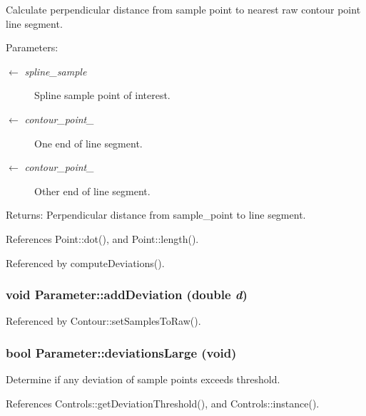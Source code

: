 Calculate perpendicular distance from sample point to nearest raw contour point line segment. \begin{Desc}
\item[Parameters:]
\begin{description}
\item[\mbox{$\leftarrow$} {\em spline\_\-sample}]Spline sample point of interest. \item[\mbox{$\leftarrow$} {\em contour\_\-point\_}]One end of line segment. \item[\mbox{$\leftarrow$} {\em contour\_\-point\_}]Other end of line segment. \end{description}
\end{Desc}
\begin{Desc}
\item[Returns:]Perpendicular distance from sample\_\-point to line segment. \end{Desc}


References Point::dot(), and Point::length().

Referenced by computeDeviations().\hypertarget{classParameter_ff6c2b408f89720293ec4db6ef186c3f}{
\subsubsection[addDeviation]{\setlength{\rightskip}{0pt plus 5cm}void Parameter::addDeviation (double {\em d})}}
\label{classParameter_ff6c2b408f89720293ec4db6ef186c3f}




Referenced by Contour::setSamplesToRaw().\hypertarget{classParameter_ec98b30f1dfebcb04e504adadb4a5787}{
\subsubsection[deviationsLarge]{\setlength{\rightskip}{0pt plus 5cm}bool Parameter::deviationsLarge (void)}}
\label{classParameter_ec98b30f1dfebcb04e504adadb4a5787}


Determine if any deviation of sample points exceeds threshold. 

References Controls::getDeviationThreshold(), and Controls::instance().

